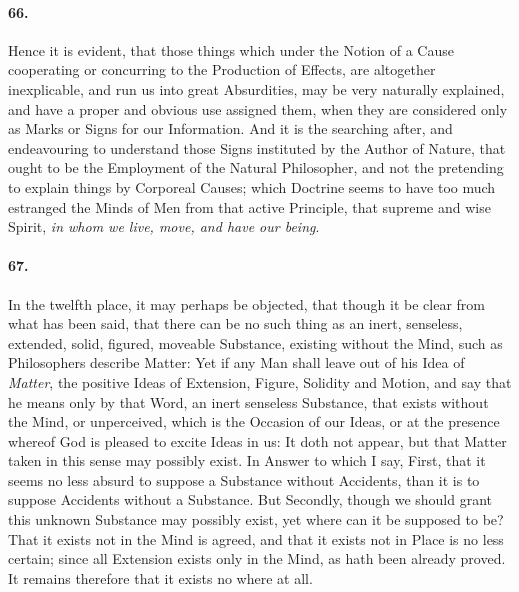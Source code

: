 \documentclass[]{article}
\newenvironment{sectionbody}{\begin{multicols}{2}}{\end{multicols}}
\begin{document}
\begin{sectionbody}
\paragraph{66.} Hence it is evident, that those things which under the Notion of
a Cause cooperating or concurring to the Production of Effects,
are altogether inexplicable, and run us into great Absurdities,
may be very naturally explained, and have a proper and obvious
use assigned them, when they are considered only as Marks or
Signs for our Information.  And it is the searching after, and
endeavouring to understand those Signs instituted by the Author
of Nature, that ought to be the Employment of the Natural
Philosopher, and not the pretending to explain things by
Corporeal Causes; which Doctrine seems to have too much estranged
the Minds of Men from that active Principle, that supreme and
wise Spirit, \emph{in whom we live, move, and have our being}.



\paragraph{67.} In the twelfth place, it may perhaps be objected, that though it
be clear from what has been said, that there can be no such thing
as an inert, senseless, extended, solid, figured, moveable
Substance, existing without the Mind, such as Philosophers
describe Matter: Yet if any Man shall leave out of his Idea of
\emph{Matter}, the positive Ideas of Extension, Figure,
Solidity and Motion, and say that he means only by that Word, an
inert senseless Substance, that exists without the Mind, or
unperceived, which is the Occasion of our Ideas, or at the
presence whereof God is pleased to excite Ideas in us: It doth
not appear, but that Matter taken in this sense may possibly
exist.  In Answer to which I say, First, that it seems no less
absurd to suppose a Substance without Accidents, than it is to
suppose Accidents without a Substance.  But Secondly, though we
should grant this unknown Substance may possibly exist, yet where
can it be supposed to be?  That it exists not in the Mind is
agreed, and that it exists not in Place is no less certain; since
all Extension exists only in the Mind, as hath been already
proved.  It remains therefore that it exists no where at all.




\end{sectionbody}
\end{document}
